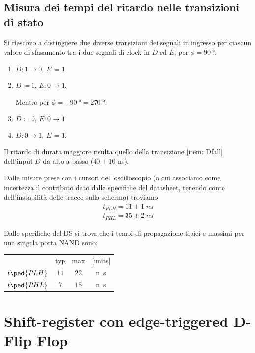 \documentclass[10pt, a4paper, italian]{article}
\begin{document}
\subsection{Misura dei tempi del ritardo nelle transizioni di stato}
Si riescono a distinguere due diverse transizioni dei segnali in ingresso per
ciascun valore di sfasamento tra i due segnali di clock in $D$ ed $E$;
per $\phi = \SI{90}{\degree}$:
\begin{enumerate}
\item $D: 1 \to 0$, $E \coloneqq 1$ \label{item: Dfall}
\item $D \coloneqq 1$, $E: 0 \to 1$. \label{item: Erise}

Mentre per $\phi = - \SI{90}{\degree} = 270 \; \si{\degree}$:
\item $D \coloneqq 0$, $E: 0 \to 1$ \label{item: Efall}
\item $D: 0 \to 1$, $E \coloneqq 1$. \label{item: Drise}
\end{enumerate}


Il ritardo di durata maggiore risulta quello della transizione
\ref{item: Dfall} dell'input $D$ da alto a basso ($40 \pm 10$ ns).

Dalle misure prese con i cursori dell'oscilloscopio (a cui associamo come
incertezza il contributo dato dalle specifiche del datasheet, tenendo conto
dell'instabilità delle tracce sullo schermo) troviamo
\begin{align*}
    t_{PLH}= 11 \pm 1 \; \si{n\s} \\
    t_{PHL}= 35 \pm 2 \; \si{n\s}
\end{align*}

Dalle specifiche del DS si trova che i tempi di propagazione tipici e massimi
per una singola porta NAND sono:
\begin{table}[htbp]
\centering
\begin{tabular}{cccc}
	& typ & max & [units] \\
    $t\ped{PLH}$ & $11$ & $22$ & \si{n\s} \\
    $t\ped{PHL}$ & $7$ & $15$ & \si{n\s}
\end{tabular}
\end{table}

\section{Shift-register con edge-triggered D-Flip Flop}
\end{document}
